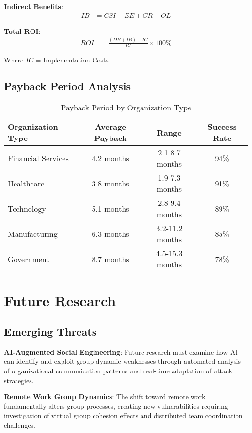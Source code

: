 \documentclass[11pt,a4paper]{article}
\begin{document}
\textbf{Indirect Benefits}:
\begin{align}
IB &= CSI + EE + CR + OL
\end{align}

\textbf{Total ROI}:
\begin{align}
ROI &= \frac{(DB + IB) - IC}{IC} \times 100\%
\end{align}

Where $IC$ = Implementation Costs.

\subsection{Payback Period Analysis}

\begin{table}[H]
\centering
\caption{Payback Period by Organization Type}
\begin{tabular}{lccc}
\toprule
Organization Type & Average Payback & Range & Success Rate \\
\midrule
Financial Services & 4.2 months & 2.1-8.7 months & 94\% \\
Healthcare & 3.8 months & 1.9-7.3 months & 91\% \\
Technology & 5.1 months & 2.8-9.4 months & 89\% \\
Manufacturing & 6.3 months & 3.2-11.2 months & 85\% \\
Government & 8.7 months & 4.5-15.3 months & 78\% \\
\bottomrule
\end{tabular}
\end{table}

\FloatBarrier

\section{Future Research}

\subsection{Emerging Threats}

\textbf{AI-Augmented Social Engineering}: Future research must examine how AI can identify and exploit group dynamic weaknesses through automated analysis of organizational communication patterns and real-time adaptation of attack strategies.

\textbf{Remote Work Group Dynamics}: The shift toward remote work fundamentally alters group processes, creating new vulnerabilities requiring investigation of virtual group cohesion effects and distributed team coordination challenges.
\end{document}
